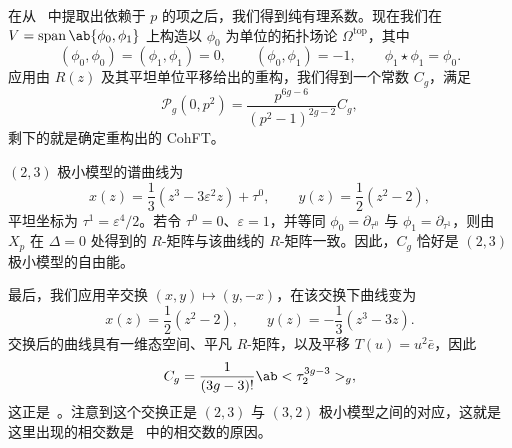 \documentclass{amsart}
\theoremstyle{definition}
\theoremstyle{remark}
\theoremstyle{plain}
\theoremstyle{definition}
\theoremstyle{remark}
\newcommand{\ep}{\varepsilon}
\newcommand{\mc}[1]{\mathcal{#1}}
\newcommand{\mr}[1]{\mathrm{#1}}
\newcommand{\on}[1]{\operatorname{#1}}
\newcommand{\1}{\mathbf{1}}
\newcommand{\2}{\mathbf{2}}
\newcommand{\3}{\mathbf{3}}
\begin{document}
在从~ 中提取出依赖于 \(p\) 的项之后，我们得到纯有理系数。现在我们在 \(V = \on{span}\ab\{\phi_0,\phi_1\}\) 上构造以 \(\phi_0\) 为单位的拓扑场论 \(\Omega^{\mr{top}}\)，其中
\[ (\phi_0,\phi_0) = (\phi_1,\phi_1) = 0, \qquad (\phi_0,\phi_1) = -1, \qquad \phi_1 \star \phi_1 = \phi_0. \]
应用由 \(R(z)\) 及其平坦单位平移给出的重构，我们得到一个常数 \(C_g\)，满足
\[ \mc{P}_g(0,p^2) = \frac{p^{6g-6}}{(p^2-1)^{2g-2}}C_g, \]
剩下的就是确定重构出的 CohFT。

\((2,3)\) 极小模型的谱曲线为
\[ x(z) = \frac{1}{3}(z^3-3\ep^2 z) + \tau^0, \qquad y(z) = \frac{1}{2}(z^2-2), \]
平坦坐标为 \(\tau^1 = \ep^4/2\)。若令 \(\tau^0 = 0\)、\(\ep = 1\)，并等同 \(\phi_0 = \partial_{\tau^0}\) 与 \(\phi_1 = \partial_{\tau^1}\)，则由 \(X_p\) 在 \(\Delta = 0\) 处得到的 \(R\)-矩阵与该曲线的 \(R\)-矩阵一致。因此，\(C_g\) 恰好是 \((2,3)\) 极小模型的自由能。

最后，我们应用辛交换 \((x,y) \mapsto (y,-x)\)，在该交换下曲线变为
\[ x(z) = \frac{1}{2}(z^2-2), \qquad y(z) = -\frac{1}{3}(z^3-3z). \]
交换后的曲线具有一维态空间、平凡 \(R\)-矩阵，以及平移 \(T(u) = u^2 \bar{e}\)，因此
\[ C_g = \frac{1}{(3g-3)!}\ab<\tau_2^{3g-3}>_g, \]
这正是~。注意到这个交换正是 \((2,3)\) 与 \((3,2)\) 极小模型之间的对应，这就是这里出现的相交数是~ 中的相交数的原因。
\printbibliography
\end{document}
